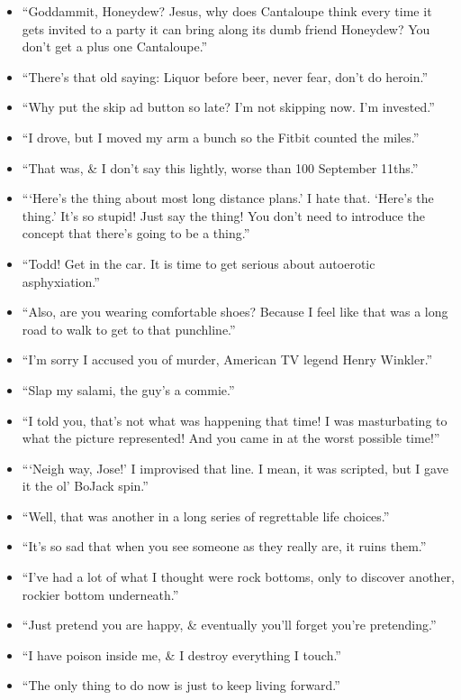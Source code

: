\documentclass{article}
\begin{document}
\begin{enumerate}
\begin{itemize}
    	\item ``Goddammit, Honeydew? Jesus, why does Cantaloupe think every time it gets invited to a party it can bring along its dumb friend Honeydew? You don't get a plus one Cantaloupe.''
    	\item ``There's that old saying: Liquor before beer, never fear, don't do heroin.''
    	\item ``Why put the skip ad button so late? I'm not skipping now. I'm invested.''
    	\item ``I drove, but I moved my arm a bunch so the Fitbit counted the miles.''
    	\item ``That was, \& I don't say this lightly, worse than 100 September 11ths.''
    	\item ```Here's the thing about most long distance plans.' I hate that. `Here's the thing.' It's so stupid! Just say the thing! You don't need to introduce the concept that there's going to be a thing.''
    	\item ``Todd! Get in the car. It is time to get serious about autoerotic asphyxiation.''
    	\item ``Also, are you wearing comfortable shoes? Because I feel like that was a long road to walk to get to that punchline.''
    	\item ``I'm sorry I accused you of murder, American TV legend Henry Winkler.''
    	\item ``Slap my salami, the guy's a commie.''
    	\item ``I told you, that's not what was happening that time! I was masturbating to what the picture represented! And you came in at the worst possible time!''
    	\item ```Neigh way, Jose!' I improvised that line. I mean, it was scripted, but I gave it the ol' BoJack spin.''
    	\item ``Well, that was another in a long series of regrettable life choices.''
    	\item ``It's so sad that when you see someone as they really are, it ruins them.''
    	\item ``I've had a lot of what I thought were rock bottoms, only to discover another, rockier bottom underneath.''
    	\item ``Just pretend you are happy, \& eventually you'll forget you're pretending.''
    	\item ``I have poison inside me, \& I destroy everything I touch.''
    	\item ``The only thing to do now is just to keep living forward.''

\end{itemize}
\end{enumerate}
\end{document}
